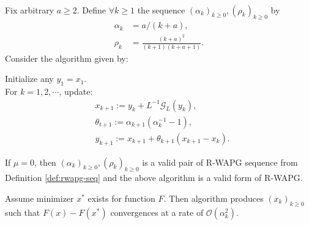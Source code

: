 \documentclass[12pt]{article}
\begin{document}
    \begin{theorem}\label{thm:r-wapg-on-cham-doss}\;\\
        Fix arbitrary $a \ge 2$.
        Define $\forall k \ge 1$ the sequence $(\alpha_k)_{k \ge 0}, (\rho_k)_{k \ge 0}$ by 
        \begin{align*}
            \alpha_k &= a/(k + a), 
            \\
            \rho_k &= \frac{(k + a)^2}{(k + 1)(k + a + 1)}. 
        \end{align*}
        Consider the algorithm given by: 
        \begin{tcolorbox}
            Initialize any $y_1 = x_1$. 
            \\
            For $k = 1, 2, \cdots$, update: 
            \begin{align*}
                & x_{k + 1} := y_k + L^{-1}\mathcal G_L(y_k), 
                \\
                & \theta_{t + 1} := \alpha_{k + 1}(\alpha_k^{-1} - 1),
                \\
                & y_{k + 1} := x_{k + 1} + \theta_{k + 1}(x_{k + 1} - x_k). 
            \end{align*}    
        \end{tcolorbox}
        If $\mu = 0$, then $(\alpha_k)_{k \ge 0}, (\rho_k)_{k \ge 0}$ is a valid pair of R-WAPG sequence from Definition \ref{def:rwapg-seq} and the above algorithm is a valid form of R-WAPG. 
        \par
        Assume minimizer $x^*$ exists for function $F$. 
        Then algorithm produces $(x_k)_{k \ge0}$ such that $F(x) - F(x^*)$ convergences at a rate of $\mathcal O(\alpha_k^2)$. 
    \end{theorem}
\end{document}

